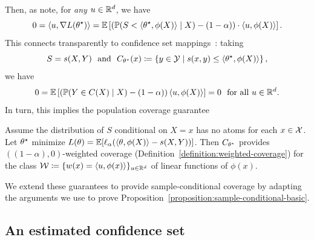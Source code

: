 \documentclass{article}
\newcommand{\loss}{\ell}
\newcommand{\poploss}{L}
\newcommand{\scorefunc}{s}
\newcommand{\scoreval}{\scorefunc}
\newcommand{\scorerv}{S}
\begin{document}
%
Then, as \citet{GibbsChCa23} note, for \emph{any} $u \in \mathbb{R}^d$, we have
\begin{equation*}
  0 = \<u, \nabla \poploss(\theta\opt)\>
  = \E\left[\left(\P(\scorerv < \<\theta\opt, \phi(X)\> \mid X)
    - (1 - \alpha)\right) \cdot \<u, \phi(X)\> \right].
\end{equation*}
This connects transparently to confidence set
mappings~\cite{GibbsChCa23,JungNoRaRo23}: taking
\begin{equation*}
  \scorerv = \scoreval(X, Y)
  ~~ \mbox{and} ~~
  C_{\theta\opt}(x) \defeq \left\{y \in \mc{Y} \mid \scoreval(x, y) \le
  \<\theta\opt, \phi(X)\>\right\},
\end{equation*}
we have
\begin{align*}
  0 = \mathbb{E}\left[\left(\mathbb{P}(Y \in C(X) \mid X) - (1 - \alpha)\right)
    \langle u, \phi(X)\rangle\right] = 0
  ~~ \mbox{for~all~} u \in \mathbb{R}^d.
\end{align*}
In turn, this implies the population coverage guarantee
\begin{corollary}
  \label{corollary:population-weighted-coverage}
  Assume the distribution of $\scorerv$ conditional on $X = x$ has no atoms
  for each $x \in \mathcal{X}$. Let $\theta^\star$ minimize $\poploss(\theta) =
  \E[\loss_\alpha(\<\theta, \phi(X)\> - \scoreval(X, Y))]$.
  Then $C_{\theta^\star}$ provides $((1 - \alpha), 0)$-weighted coverage
  (Definition~\ref{definition:weighted-coverage}) for the class $\mathcal{W}
  \coloneqq \{w(x) = \langle u, \phi(x)\rangle\}_{u \in \mathbb{R}^d}$ of linear functions
  of $\phi(x)$.
\end{corollary}

We extend these guarantees to provide sample-conditional coverage by
adapting the arguments we use
to prove Proposition~\ref{proposition:sample-conditional-basic}.



\subsection{An estimated confidence set}

\newcommand{\ballphi}{\ball_\phi}
\end{document}
